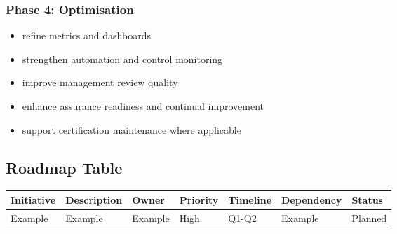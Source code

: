 \documentclass[
  letterpaper,
  DIV=11,
  numbers=noendperiod]{scrartcl}
\providecommand{\tightlist}{%
  \setlength{\itemsep}{0pt}\setlength{\parskip}{0pt}}
\begin{document}
\subsubsection{Phase 4: Optimisation}\label{phase-4-optimisation}

\begin{itemize}
\tightlist
\item
  refine metrics and dashboards
\item
  strengthen automation and control monitoring
\item
  improve management review quality
\item
  enhance assurance readiness and continual improvement
\item
  support certification maintenance where applicable
\end{itemize}

\subsection{Roadmap Table}\label{roadmap-table}

\begin{longtable}[]{@{}
  >{\raggedright\arraybackslash}p{}
  >{\raggedright\arraybackslash}p{}
  >{\raggedright\arraybackslash}p{}
  >{\raggedright\arraybackslash}p{}
  >{\raggedright\arraybackslash}p{}
  >{\raggedright\arraybackslash}p{}
  >{\raggedright\arraybackslash}p{}@{}}
\toprule\noalign{}
\begin{minipage}[b]{\linewidth}\raggedright
Initiative
\end{minipage} & \begin{minipage}[b]{\linewidth}\raggedright
Description
\end{minipage} & \begin{minipage}[b]{\linewidth}\raggedright
Owner
\end{minipage} & \begin{minipage}[b]{\linewidth}\raggedright
Priority
\end{minipage} & \begin{minipage}[b]{\linewidth}\raggedright
Timeline
\end{minipage} & \begin{minipage}[b]{\linewidth}\raggedright
Dependency
\end{minipage} & \begin{minipage}[b]{\linewidth}\raggedright
Status
\end{minipage} \\
\midrule\noalign{}
\endhead
\bottomrule\noalign{}
\endlastfoot
Example & Example & Example & High & Q1-Q2 & Example & Planned \\
\end{longtable}
\end{document}
